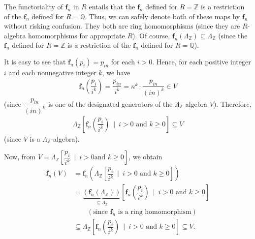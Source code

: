 \documentclass[10pt,a4paper]{article}
\begin{document}
The functoriality of $\mathbf{f}_n$ in $R$ entails that the $\mathbf{f}_n$
defined for $R=\mathbb{Z}$ is a restriction of the $\mathbf{f}_n$ defined
for $R=\mathbb{Q}$. Thus, we can safely denote both of these maps by
$\mathbf{f}_n$ without risking confusion. They both are ring homomorphisms
(since they are $R$-algebra homomorphisms for appropriate $R$). Of course,
$\mathbf{f}_n\left(  \Lambda_{\mathbb{Z}}\right)  \subseteq\Lambda
_{\mathbb{Z}}$ (since the $\mathbf{f}_n$ defined for $R=\mathbb{Z}$ is a
restriction of the $\mathbf{f}_n$ defined for $R=\mathbb{Q}$).




It is easy to see that $\mathbf{f}_n\left(  p_{i}\right)  =p_{in}$ for each
$i>0$. Hence, for each positive integer $i$ and each nonnegative integer $k$,
we have
\begin{align*}
\mathbf{f}_n\left(  \dfrac{p_{i}}{i^{k}}\right)  =\dfrac{p_{in}}{i^{k}
}=n^{k}\cdot\dfrac{p_{in}}{\left(  in\right)  ^{k}}\in V
\end{align*}
(since $\dfrac{p_{in}}{\left(  in\right)  ^{k}}$ is one of the designated
generators of the $\Lambda_{\mathbb{Z}}$-algebra $V$). Therefore,
\begin{align*}
\Lambda_{\mathbb{Z}}\left[  \mathbf{f}_n\left(  \dfrac{p_{i}}{i^{k}}\right)
\ \mid\ i>0\text{ and }k\geq0\right]  \subseteq V
\end{align*}
(since $V$ is a $\Lambda_{\mathbb{Z}}$-algebra).




Now, from $V=\Lambda_{\mathbb{Z}}\left[  \dfrac{p_{i}}{i^{k}}\ \mid\ i>0\text{
and }k\geq0\right]  $, we obtain
\begin{align*}
\mathbf{f}_n\left(  V\right)   &  =\mathbf{f}_n\left(  \Lambda
_{\mathbb{Z}}\left[  \dfrac{p_{i}}{i^{k}}\ \mid\ i>0\text{ and }k\geq0\right]
\right)  \\
&  =\underbrace{\left(  \mathbf{f}_n\left(  \Lambda_{\mathbb{Z}}\right)
\right)  }_{\subseteq\Lambda_{\mathbb{Z}}}\left[  \mathbf{f}_n\left(
\dfrac{p_{i}}{i^{k}}\right)  \ \mid\ i>0\text{ and }k\geq0\right]  \\
&  \qquad\left(  \text{since }\mathbf{f}_n\text{ is a ring homomorphism}
\right)  \\
&  \subseteq\Lambda_{\mathbb{Z}}\left[  \mathbf{f}_n\left(  \dfrac{p_{i}
}{i^{k}}\right)  \ \mid\ i>0\text{ and }k\geq0\right]  \subseteq V.
\end{align*}
\end{document}

